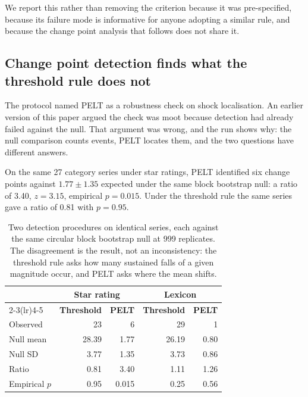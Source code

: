 \documentclass[11pt,a4paper]{article}
\makeatletter
\let\original@subsection\subsection
\renewcommand{\subsection}{\FloatBarrier\original@subsection}%
\makeatother
\begin{document}
We report this rather than removing the criterion because it was
pre-specified, because its failure mode is informative for anyone adopting a
similar rule, and because the change point analysis that follows does not share
it.

\subsection{Change point detection finds what the threshold rule does not}
\label{sec:pelt}

The protocol named PELT as a robustness check on shock localisation. An earlier
version of this paper argued the check was moot because detection had already
failed against the null. That argument was wrong, and the run shows why: the
null comparison counts events, PELT locates them, and the two questions have
different answers.

On the same 27 category series under star ratings, PELT identified six change
points against $1.77 \pm 1.35$ expected under the same block bootstrap null:
a ratio of 3.40, $z = 3.15$, empirical $p = 0.015$. Under the threshold rule the
same series gave a ratio of 0.81 with $p = 0.95$.

\begin{table}[htbp]
\centering
\caption{Two detection procedures on identical series, each against the same
circular block bootstrap null at 999 replicates. The disagreement is the
result, not an inconsistency: the threshold rule asks how many sustained falls
of a given magnitude occur, and PELT asks where the mean shifts.}
\label{tab:pelt}
\small
\begin{tabular}{@{}lrrrr@{}}
\toprule
& \multicolumn{2}{c}{\textbf{Star rating}} & \multicolumn{2}{c}{\textbf{Lexicon}} \\
\cmidrule(lr){2-3}\cmidrule(lr){4-5}
& \textbf{Threshold} & \textbf{PELT} & \textbf{Threshold} & \textbf{PELT} \\
\midrule
Observed          & 23    & 6     & 29    & 1     \\
Null mean         & 28.39 & 1.77  & 26.19 & 0.80  \\
Null SD           & 3.77  & 1.35  & 3.73  & 0.86  \\
Ratio             & 0.81  & 3.40  & 1.11  & 1.26  \\
Empirical $p$     & 0.95  & 0.015 & 0.25  & 0.56  \\
\bottomrule
\end{tabular}
\end{table}
\end{document}
